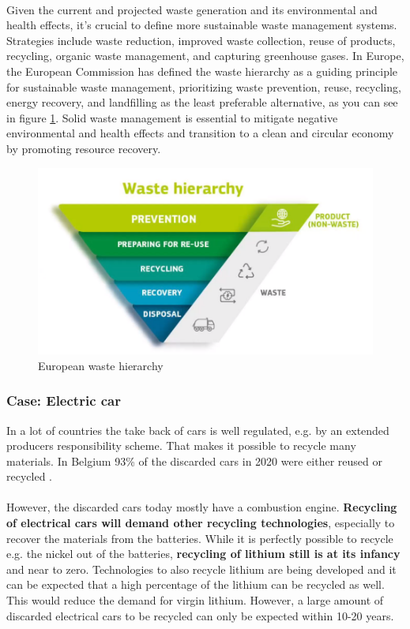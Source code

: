 \documentclass[../summary.tex]{subfiles}
\begin{document}
\\
Given the current and projected waste generation and its environmental and health effects, it's crucial to define more sustainable waste management systems. Strategies include waste reduction, improved waste collection, reuse of products, recycling, organic waste management, and capturing greenhouse gases. In Europe, the European Commission has defined the waste hierarchy as a guiding principle for sustainable waste management, prioritizing waste prevention, reuse, recycling, energy recovery, and landfilling as the least preferable alternative, as you can see in figure \ref{fig:wastehierarchy}. Solid waste management is essential to mitigate negative environmental and health effects and transition to a clean and circular economy by promoting resource recovery.

\begin{figure}[H]
	\centering
	\includegraphics[width=0.8\linewidth]{../images/waste_hierarchy}
	\caption{European waste hierarchy}
	\label{fig:wastehierarchy}
\end{figure}
\newpage
\subsubsection{Case: Electric car}

In a lot of countries the take back of cars is well regulated, e.g. by an extended producers responsibility scheme. That makes it possible to recycle many materials. In Belgium 93\% of the discarded cars in 2020 were either reused or recycled . \\
\\
However, the discarded cars today mostly have a combustion engine. \textbf{Recycling of electrical cars will demand other recycling technologies}, especially to recover the materials from the batteries. While it is perfectly possible to recycle e.g. the nickel out of the batteries, \textbf{recycling of lithium still is at its infancy} and near to zero. Technologies to also recycle lithium are being developed and it can be expected that a high percentage of the lithium can be recycled as well. This would reduce the demand for virgin lithium. However, a large amount of discarded electrical cars to be recycled can only be expected within 10-20 years.
\end{document}
